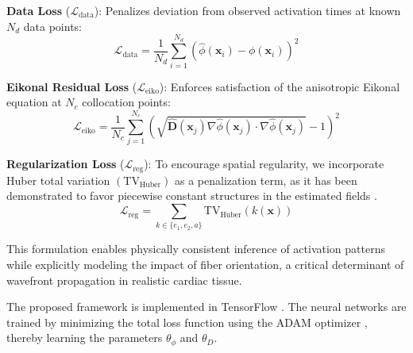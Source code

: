 \textbf{Data Loss} ($\mathcal{L}_{\text{data}}$): Penalizes deviation from observed activation times at known $N_d$ data points:
\begin{equation}
\mathcal{L}_{\text{data}} = \frac{1}{N_d} \sum_{i=1}^{N_d} \left(\hat{\phi}(\mathbf{x}_i) - \phi(\mathbf{x}_i)\right)^2
\end{equation}

\textbf{Eikonal Residual Loss} ($\mathcal{L}_{\text{eiko}}$): Enforces satisfaction of the anisotropic Eikonal equation at $N_c$ collocation points:
\begin{equation}
    \mathcal{L}_{\text{eiko}} = \frac{1}{N_c} \sum_{j=1}^{N_c} \left(\sqrt{ \mathbf{\hat D}(\mathbf{x}_j) \nabla \hat{\phi}(\mathbf{x}_j) \cdot \nabla \hat{\phi}(\mathbf{x}_j)} - 1\right)^2
\end{equation}


\textbf{Regularization Loss} ($\mathcal{L}_{\text{reg}}$): To encourage spatial regularity, we incorporate Huber total variation $\left(\text{TV}_{\text{Huber}}\right)$ as a penalization term, as it has been demonstrated to favor piecewise constant structures in the estimated fields \cite{Chambolle_Pock_2016}.
\begin{equation}
    \mathcal{L}_{\text{reg}} = \sum_{k \in \{e_1, e_2, a\}} \text{TV}_{\text{Huber}}(k(\mathbf{x}))
\end{equation}


This formulation enables physically consistent inference of activation patterns while explicitly modeling the impact of fiber orientation, a critical determinant of wavefront propagation in realistic cardiac tissue.

The proposed framework is implemented in TensorFlow \cite{abadi2016tensorflowlargescalemachinelearning}. The neural networks are trained by minimizing the total loss function using the ADAM optimizer \cite{kingma2017adammethodstochasticoptimization}, thereby learning the parameters $\theta_\phi$ and $\theta_D$.